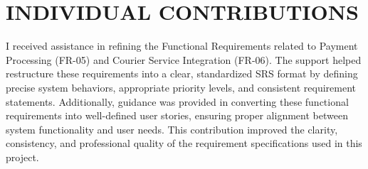 \chapter{INDIVIDUAL CONTRIBUTIONS} \label{ch:data}
I received assistance in refining the Functional Requirements related to Payment Processing (FR-05) and Courier Service Integration (FR-06). The support helped restructure these requirements into a clear, standardized SRS format by defining precise system behaviors, appropriate priority levels, and consistent requirement statements. Additionally, guidance was provided in converting these functional requirements into well-defined user stories, ensuring proper alignment between system functionality and user needs. This contribution improved the clarity, consistency, and professional quality of the requirement specifications used in this project.



